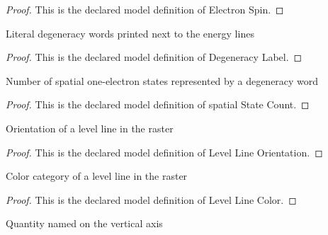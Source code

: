 \begin{proof}
  This is the declared model definition of Electron Spin.
\end{proof}
\begin{definition}
  \label{def:physics:phyx-mini-0580:phyxminiproblems-problemphyxmini0580-degeneracylabel}
  Literal degeneracy words printed next to the energy lines
\end{definition}
\begin{proof}
  This is the declared model definition of Degeneracy Label.
\end{proof}
\begin{definition}
  \label{def:physics:phyx-mini-0580:phyxminiproblems-problemphyxmini0580-degeneracylabel-spatialstatecount}
  Number of spatial one-electron states represented by a degeneracy word
\end{definition}
\begin{proof}
  This is the declared model definition of spatial State Count.
\end{proof}
\begin{definition}
  \label{def:physics:phyx-mini-0580:phyxminiproblems-problemphyxmini0580-levellineorientation}
  Orientation of a level line in the raster
\end{definition}
\begin{proof}
  This is the declared model definition of Level Line Orientation.
\end{proof}
\begin{definition}
  \label{def:physics:phyx-mini-0580:phyxminiproblems-problemphyxmini0580-levellinecolor}
  Color category of a level line in the raster
\end{definition}
\begin{proof}
  This is the declared model definition of Level Line Color.
\end{proof}
\begin{definition}
  \label{def:physics:phyx-mini-0580:phyxminiproblems-problemphyxmini0580-verticalaxisquantity}
  Quantity named on the vertical axis
\end{definition}
